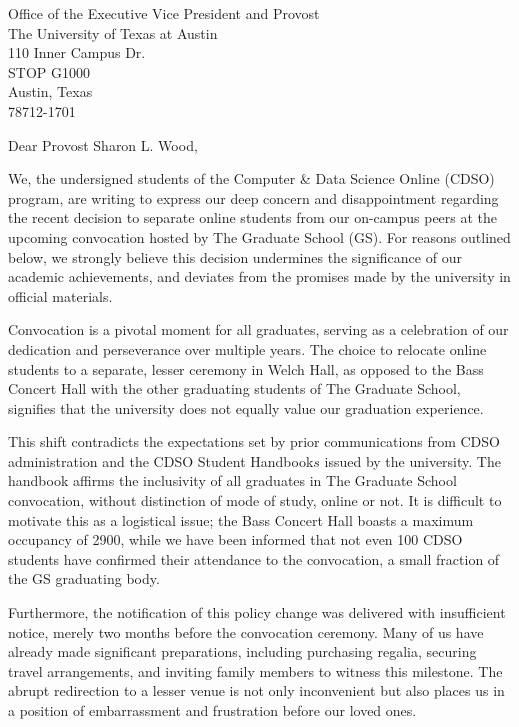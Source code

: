 \documentclass[11pt]{letter}
\begin{document}
\begin{letter}{Office of the Executive Vice President and Provost \\ The University of Texas at Austin \\ 110 Inner Campus Dr. \\ STOP G1000 \\ Austin, Texas \\ 78712-1701}
    \opening{Dear Provost Sharon L. Wood,}

    We, the undersigned students of the Computer \& Data Science Online (CDSO) program, are writing to express our deep concern and disappointment regarding the recent decision to separate online students from our on-campus peers at the upcoming convocation hosted by The Graduate School (GS). For reasons outlined below, we strongly believe this decision undermines the significance of our academic achievements, and deviates from the promises made by the university in official materials.

    Convocation is a pivotal moment for all graduates, serving as a celebration of our dedication and perseverance over multiple years. The choice to relocate online students to a separate, lesser ceremony in Welch Hall, as opposed to the Bass Concert Hall with the other graduating students of The Graduate School, signifies that the university does not equally value our graduation experience.
    
    This shift contradicts the expectations set by prior communications from CDSO administration and the CDSO Student Handbook\(s\) issued by the university. The handbook affirms the inclusivity of all graduates in The Graduate School convocation, without distinction of mode of study, online or not. It is difficult to motivate this as a logistical issue; the Bass Concert Hall boasts a maximum occupancy of 2900, while we have been informed that not even 100 CDSO students have confirmed their attendance to the convocation, a small fraction of the GS graduating body.
    
    Furthermore, the notification of this policy change was delivered with insufficient notice, merely two months before the convocation ceremony. Many of us have already made significant preparations, including purchasing regalia, securing travel arrangements, and inviting family members to witness this milestone. The abrupt redirection to a lesser venue is not only inconvenient but also places us in a position of embarrassment and frustration before our loved ones.
    

\end{letter}
\end{document}
